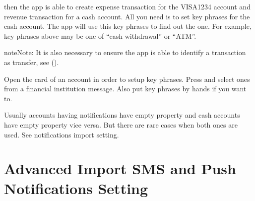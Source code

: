 \documentclass[a4paper,10pt,english]{sphinxmanual}
\begin{document}
\sphinxAtStartPar
then the app is able to create expense transaction for the VISA1234 account and revenue transaction
for a cash account. All you need is to set key phrases for the cash account. The app will
use this key phrases to find out the one. For example, key phrases above may be one of “cash withdrawal” or
“ATM”.

\begin{sphinxadmonition}{note}{Note:}
\sphinxAtStartPar
It is also necessary to ensure the app is able to identify a transaction as transfer, see {\hyperref[\detokenize{notifications:chapter-notifications}]{}} ().
\end{sphinxadmonition}

\sphinxAtStartPar
Open the card of an account in order to setup key phrases. Press  and
select ones from a financial institution message. Also put key phrases by hands
if you want to.

\noindent{}
\noindent{}
\noindent{}

\sphinxAtStartPar
Usually accounts having notifications have empty  property and cash accounts
have empty  property vice versa. But there are rare cases when both ones are used. See 
notifications import setting.

\sphinxstepscope


\chapter{Advanced Import SMS and Push Notifications Setting}
\label{\detokenize{notifications:advanced-import-sms-and-push-notifications-setting}}\label{\detokenize{notifications:chapter-notifications}}\label{\detokenize{notifications::doc}}
\end{document}
